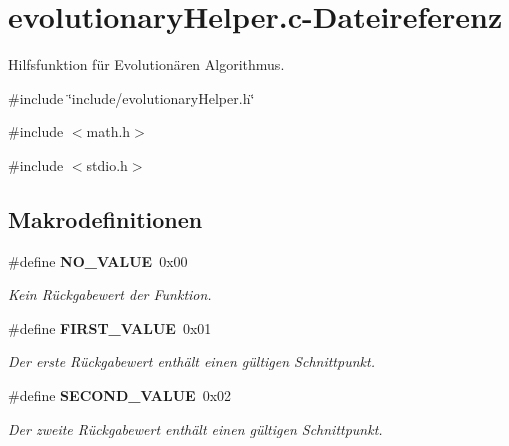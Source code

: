 \section{evolutionaryHelper.c-\/Dateireferenz}
\label{evolutionary_helper_8c}


Hilfsfunktion für Evolutionären Algorithmus.  


{\ttfamily \#include \char`\"{}include/evolutionaryHelper.h\char`\"{}}\par
{\ttfamily \#include $<$math.h$>$}\par
{\ttfamily \#include $<$stdio.h$>$}\par
\subsection*{Makrodefinitionen}
\begin{DoxyCompactItemize}
\item 
\#define {\bf NO\_\-VALUE}~0x00
\begin{DoxyCompactList}\small\item\em Kein Rückgabewert der Funktion. \item\end{DoxyCompactList}\item 
\#define {\bf FIRST\_\-VALUE}~0x01
\begin{DoxyCompactList}\small\item\em Der erste Rückgabewert enthält einen gültigen Schnittpunkt. \item\end{DoxyCompactList}\item 
\#define {\bf SECOND\_\-VALUE}~0x02
\begin{DoxyCompactList}\small\item\em Der zweite Rückgabewert enthält einen gültigen Schnittpunkt. \item\end{DoxyCompactList}\end{DoxyCompactItemize}
